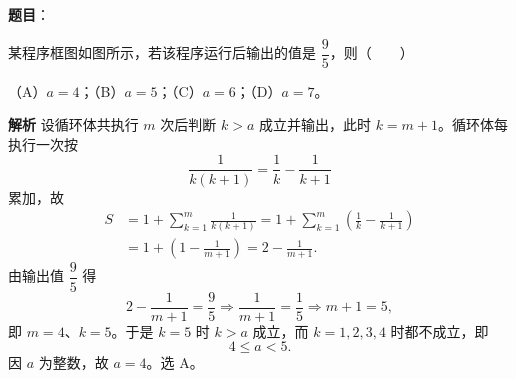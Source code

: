 \begin{answer}

\textbf{题目}：

某程序框图如图所示，若该程序运行后输出的值是 $\dfrac95$，则\mbox{（　　）}
\nopagebreak[4]
\begin{center}\end{center}
\nopagebreak[4]
（A）$a=4$；（B）$a=5$；（C）$a=6$；（D）$a=7$。

\textbf{解析}
设循环体共执行 $m$ 次后判断 $k>a$ 成立并输出，此时 $k=m+1$。循环体每执行一次按
\nopagebreak[4]
\[\frac1{k(k+1)}=\frac1k-\frac1{k+1}\]
累加，故
\nopagebreak[4]
\[\begin{aligned}
S&=1+\sum_{k=1}^{m}\frac1{k(k+1)}
=1+\sum_{k=1}^{m}\left(\frac1k-\frac1{k+1}\right)\\
&=1+\left(1-\frac1{m+1}\right)=2-\frac1{m+1}.
\end{aligned}\]
由输出值 $\dfrac95$ 得
\nopagebreak[4]
\[2-\frac1{m+1}=\frac95\Longrightarrow\frac1{m+1}=\frac15\Longrightarrow m+1=5,\]
即 $m=4$、$k=5$。于是 $k=5$ 时 $k>a$ 成立，而 $k=1,2,3,4$ 时都不成立，即
\nopagebreak[4]
\[4\leqslant a<5.\]
因 $a$ 为整数，故 $a=4$。选 A。


\end{answer}
